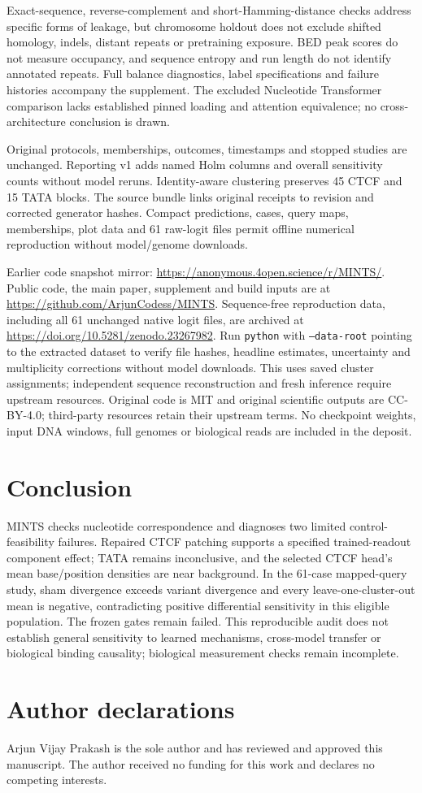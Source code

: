 \documentclass[unnumsec,webpdf,modern,large,namedate]{oup-authoring-template}
\begin{document}
Exact-sequence, reverse-complement and short-Hamming-distance checks address specific forms of leakage, but chromosome holdout does not exclude shifted homology, indels, distant repeats or pretraining exposure. BED peak scores do not measure occupancy, and sequence entropy and run length do not identify annotated repeats. Full balance diagnostics, label specifications and failure histories accompany the supplement. The excluded Nucleotide Transformer comparison lacks established pinned loading and attention equivalence; no cross-architecture conclusion is drawn.

Original protocols, memberships, outcomes, timestamps and stopped studies are unchanged. Reporting v1 adds named Holm columns and overall sensitivity counts without model reruns. Identity-aware clustering preserves 45 CTCF and 15 TATA blocks. The source bundle links original receipts to revision  and corrected generator hashes. Compact predictions, cases, query maps, memberships, plot data and 61 raw-logit files permit offline numerical reproduction without model/genome downloads.

Earlier code snapshot mirror: \url{https://anonymous.4open.science/r/MINTS/}. Public code, the main paper, supplement and build inputs are at \url{https://github.com/ArjunCodess/MINTS}. Sequence-free reproduction data, including all 61 unchanged native logit files, are archived at \url{https://doi.org/10.5281/zenodo.23267982}. Run \texttt{python}  with \texttt{--data-root} pointing to the extracted dataset to verify file hashes, headline estimates, uncertainty and multiplicity corrections without model downloads. This uses saved cluster assignments; independent sequence reconstruction and fresh inference require upstream resources. Original code is MIT and original scientific outputs are CC-BY-4.0; third-party resources retain their upstream terms. No checkpoint weights, input DNA windows, full genomes or biological reads are included in the deposit.
\section{Conclusion}
MINTS checks nucleotide correspondence and diagnoses two limited control-feasibility failures. Repaired CTCF patching supports a specified trained-readout component effect; TATA remains inconclusive, and the selected CTCF head's mean base/position densities are near background. In the 61-case mapped-query study, sham divergence exceeds variant divergence and every leave-one-cluster-out mean is negative, contradicting positive differential sensitivity in this eligible population. The frozen gates remain failed. This reproducible audit does not establish general sensitivity to learned mechanisms, cross-model transfer or biological binding causality; biological measurement checks remain incomplete.
\section*{Author declarations}
Arjun Vijay Prakash is the sole author and has reviewed and approved this manuscript. The author received no funding for this work and declares no competing interests.

\end{document}
